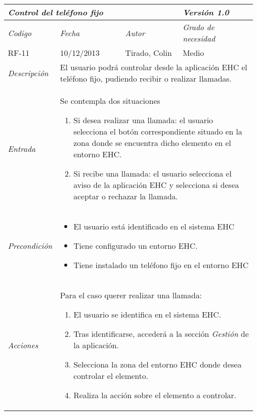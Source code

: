 \begin{center}
    \begin{tabular}{|p{3cm}|p{4cm}|p{4cm}|p{4cm}|}
    \hline \multicolumn{3}{|p{9cm}|}{\textit{Control del tel\'efono fijo}} & \textit{Versi\'on 1.0} \\
    \hline \textit{Codigo} & \textit{Fecha} & \textit{Autor} & \textit{Grado de necesidad} \\
    RF-11 & 10/12/2013 & Tirado, Colin & Medio \\
    \hline \textit{Descripci\'on} & \multicolumn{3}{|p{9cm}|}{El usuario podr\'a controlar desde la aplicaci\'on EHC el tel\'efono fijo, pudiendo recibir o realizar llamadas.} \\
    \hline \textit{Entrada} & \multicolumn{3}{|p{9cm}|}{Se contempla dos situaciones
    \begin{enumerate}
    \item Si desea realizar una llamada: el usuario selecciona el bot\'on correspondiente situado en la zona donde se encuentra dicho elemento en el entorno EHC.
    \item Si recibe una llamada: el usuario selecciona el aviso de la aplicaci\'on EHC y selecciona si desea aceptar o rechazar la llamada.
    \end{enumerate}} \\
    \hline \textit{Precondici\'on} & \multicolumn{3}{|p{9cm}|}{
    \begin{itemize}
    \item El usuario est\'a identificado en el sistema EHC
    \item Tiene configurado un entorno EHC.
    \item Tiene instalado un tel\'efono fijo en el entorno EHC
    \end{itemize}
    } \\
    \hline \textit{Acciones} & \multicolumn{3}{|p{9cm}|}{
    Para el caso querer realizar una llamada:
    \begin{enumerate}
    \item El usuario se identifica en el sistema EHC.
    \item Tras identificarse, acceder\'a a la secci\'on \textit{Gesti\'on} de la aplicaci\'on.
    \item Selecciona la zona del entorno EHC donde desea controlar el elemento.
    \item Realiza la acci\'on sobre el elemento a controlar.
    \end{enumerate}

}
\end{tabular}
\end{center}
